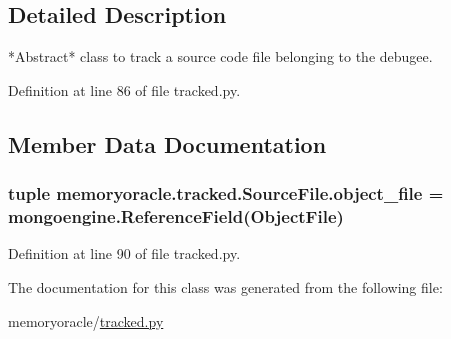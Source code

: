 \subsection{Detailed Description}
\begin{DoxyVerb}*Abstract* class to track a source code file belonging to the debugee.
\end{DoxyVerb}
 

Definition at line 86 of file tracked.\+py.



\subsection{Member Data Documentation}
\hypertarget{classmemoryoracle_1_1tracked_1_1SourceFile_a1e1996b8f71968e4cf6f9e5cc57bc14c}{}
\subsubsection[{object\+\_\+file}]{\setlength{\rightskip}{0pt plus 5cm}tuple memoryoracle.\+tracked.\+Source\+File.\+object\+\_\+file = mongoengine.\+Reference\+Field({\bf Object\+File})\hspace{0.3cm}{\ttfamily [static]}}\label{classmemoryoracle_1_1tracked_1_1SourceFile_a1e1996b8f71968e4cf6f9e5cc57bc14c}


Definition at line 90 of file tracked.\+py.



The documentation for this class was generated from the following file\+:\begin{DoxyCompactItemize}
\item 
memoryoracle/\hyperlink{tracked_8py}{tracked.\+py}\end{DoxyCompactItemize}
